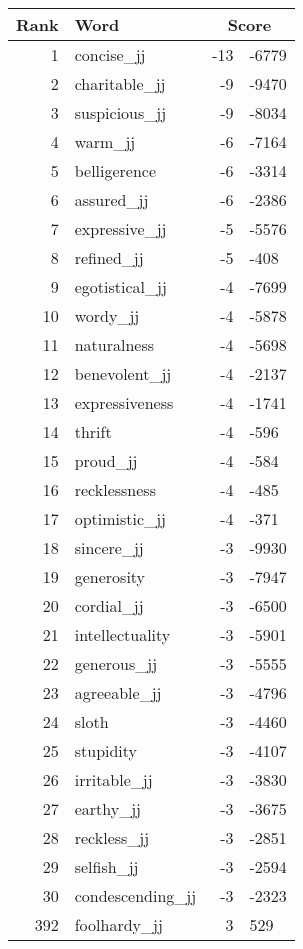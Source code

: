 \begin{longtable}[!htbp]{| rlr@{.}l |}
    \hline
    \textbf{Rank} & \textbf{Word} & \multicolumn{2}{c|}{\textbf{Score}} \\
    \hline
    \endhead
    1 & concise\_jj & -13 & -6779 \\
    2 & charitable\_jj & -9 & -9470 \\
    3 & suspicious\_jj & -9 & -8034 \\
    4 & warm\_jj & -6 & -7164 \\
    5 & belligerence & -6 & -3314 \\
    6 & assured\_jj & -6 & -2386 \\
    7 & expressive\_jj & -5 & -5576 \\
    8 & refined\_jj & -5 & -408 \\
    9 & egotistical\_jj & -4 & -7699 \\
    10 & wordy\_jj & -4 & -5878 \\
    11 & naturalness & -4 & -5698 \\
    12 & benevolent\_jj & -4 & -2137 \\
    13 & expressiveness & -4 & -1741 \\
    14 & thrift & -4 & -596 \\
    15 & proud\_jj & -4 & -584 \\
    16 & recklessness & -4 & -485 \\
    17 & optimistic\_jj & -4 & -371 \\
    18 & sincere\_jj & -3 & -9930 \\
    19 & generosity & -3 & -7947 \\
    20 & cordial\_jj & -3 & -6500 \\
    21 & intellectuality & -3 & -5901 \\
    22 & generous\_jj & -3 & -5555 \\
    23 & agreeable\_jj & -3 & -4796 \\
    24 & sloth & -3 & -4460 \\
    25 & stupidity & -3 & -4107 \\
    26 & irritable\_jj & -3 & -3830 \\
    27 & earthy\_jj & -3 & -3675 \\
    28 & reckless\_jj & -3 & -2851 \\
    29 & selfish\_jj & -3 & -2594 \\
    30 & condescending\_jj & -3 & -2323 \\
    392 & foolhardy\_jj & 3 & 529 \\

\end{longtable}
